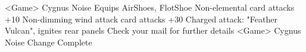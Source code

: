<Game> Cygnus Noise 
Equips AirShoes, FlotShoe 
Non-elemental card attacks +10 
Non-dimming wind attack card attacks +30 
Charged attack: "Feather Vulcan", ignites rear panels 
Check your mail for further details 
<Game> Cygnus Noise Change Complete 
